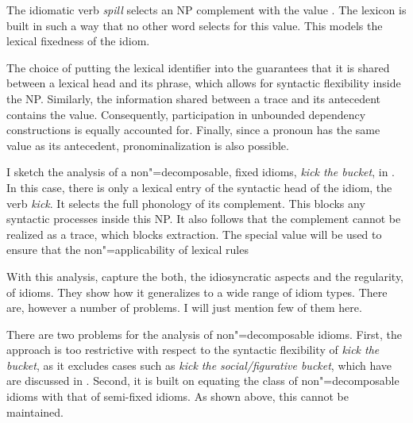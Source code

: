 \documentclass[output=paper]{langsci/langscibook}
\begin{document}
The idiomatic verb \emph{spill} selects an NP complement with the  value . 
The lexicon is built in such a way that no other word selects for this  value. 
This models the lexical fixedness of the idiom.

The choice of putting the lexical identifier into the  guarantees that it is shared between a lexical head and its phrase, which allows for syntactic flexibility inside the NP. 
Similarly, the information shared between a trace and its antecedent contains the  value. Consequently, participation in unbounded dependency constructions is equally accounted for.
Finally, since a pronoun has the same  value as its antecedent, pronominalization is also possible. 
%


I sketch the analysis of a non"=decomposable, fixed idioms, \emph{kick the bucket}, in . 
In this case, there is only a lexical entry of the syntactic head of the idiom, the verb \emph{kick}. 
It selects the full phonology of its complement. This blocks any syntactic processes inside this NP. It also follows that the complement cannot be realized as a trace, which blocks extraction. The special  value  will be used to ensure that the non"=applicability of lexical rules 


\ea %
\label{ke-kick}
\z 


With this analysis, \cite{KE94a} capture the both, the idiosyncratic aspects and the regularity, of idioms. 
They show how it generalizes to a wide range of idiom types. 
There are, however a number of problems. I will just mention few of them here.

There are two problems for the analysis of non"=decomposable idioms. 
First, the approach is too restrictive with respect to the syntactic flexibility of \emph{kick the bucket}, as it excludes cases such as \emph{kick the social/figurative bucket}, which have are discussed in  \cite{Ernst:81}. 
Second, it is built on equating the class of non"=decomposable idioms with that of semi-fixed idioms. As shown above, this cannot be maintained. 
\end{document}
